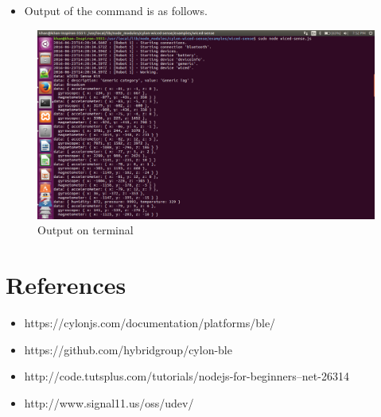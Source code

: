 \documentclass[11pt,a4paper]{article}
\begin{document}
\begin{itemize}
\begin{itemize}
	\item Output of the command is as follows.
	\end{itemize}
	\begin{figure}[h]
    \centering
	\includegraphics[scale=0.35]{ble-data.png}
	\caption{Output on terminal}
	\end{figure}
    \end{itemize}
    
    
    \newpage
	\section{References}
	 \begin{itemize}
	 \item https://cylonjs.com/documentation/platforms/ble/
	     \item https://github.com/hybridgroup/cylon-ble
	         \item http://code.tutsplus.com/tutorials/nodejs-for-beginners--net-26314
	         \item http://www.signal11.us/oss/udev/
	     \end{itemize}
\end{document}
